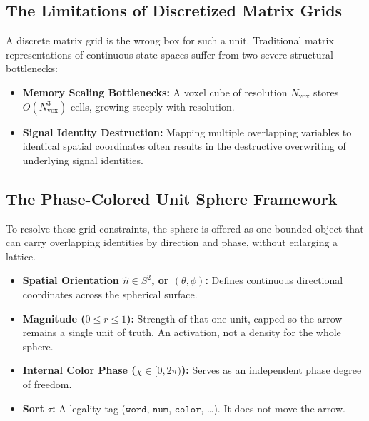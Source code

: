 \documentclass[12pt, a4paper]{article}
\begin{document}
\subsection{The Limitations of Discretized Matrix Grids}
A discrete matrix grid is the wrong box for such a unit. Traditional matrix representations of continuous state spaces suffer from two severe structural bottlenecks:
\begin{itemize}
    \item \textbf{Memory Scaling Bottlenecks:} A voxel cube of resolution $N_{\mathrm{vox}}$ stores $O(N_{\mathrm{vox}}^3)$ cells, growing steeply with resolution.
    \item \textbf{Signal Identity Destruction:} Mapping multiple overlapping variables to identical spatial coordinates often results in the destructive overwriting of underlying signal identities.
\end{itemize}

\subsection{The Phase-Colored Unit Sphere Framework}
To resolve these grid constraints, the sphere is offered as one bounded object that can carry overlapping identities by direction and phase, without enlarging a lattice.
\begin{itemize}
    \item \textbf{Spatial Orientation $\hat n \in S^2$, or $(\theta, \phi)$:} Defines continuous directional coordinates across the spherical surface.
    \item \textbf{Magnitude ($0 \leq r \leq 1$):} Strength of that one unit, capped so the arrow remains a single unit of truth. An activation, not a density for the whole sphere.
    \item \textbf{Internal Color Phase ($\chi \in [0, 2\pi)$):} Serves as an independent phase degree of freedom.
    \item \textbf{Sort $\tau$:} A legality tag ($\mathtt{word}$, $\mathtt{num}$, $\mathtt{color}$, \ldots). It does not move the arrow.
\end{itemize}
\end{document}
